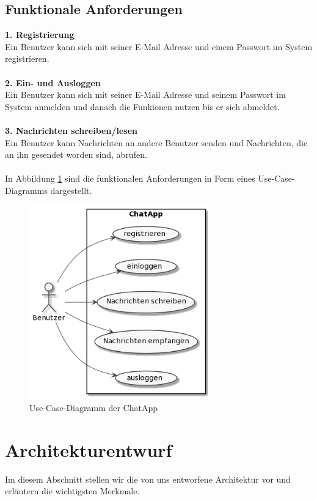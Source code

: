 \subsection{Funktionale Anforderungen}
\textbf{1. Registrierung}\\
Ein Benutzer kann sich mit seiner E-Mail Adresse und einem Passwort im System registrieren.\\
\\
\textbf{2. Ein- und Ausloggen}\\
Ein Benutzer kann sich mit seiner E-Mail Adresse und seinem Passwort im System anmelden und danach die Funkionen nutzen bis er sich abmeldet.\\
\\
\textbf{3. Nachrichten schreiben/lesen}\\
Ein Benutzer kann Nachrichten an andere Benutzer senden und Nachrichten, die an ihn gesendet worden sind, abrufen.\\
\\
In Abbildung \ref{use-case} sind die funktionalen Anforderungen in Form eines Use-Case-Diagramms dargestellt.
\begin{figure}[bth] 
	\centering
	\includegraphics[width=0.7\textwidth]{Graphics/Usecase-Diagramm.png}
	\caption{Use-Case-Diagramm der ChatApp}
	\label{use-case}
\end{figure}

\section{Architekturentwurf}
Im diesem Abschnitt stellen wir die von uns entworfene Architektur vor und erläutern die wichtigsten Merkmale.
